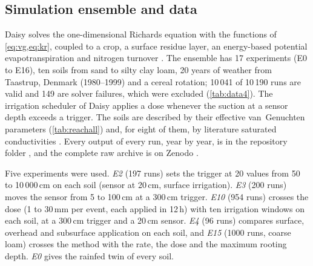\documentclass[review,12pt,authoryear]{elsarticle}
\begin{document}
\subsection{Simulation ensemble and data}
Daisy solves the one-dimensional Richards equation \citep{Richards1931} with the functions of \cref{eq:vg,eq:kr}, coupled to a crop, a surface residue layer, an energy-based potential evapotranspiration and nitrogen turnover \citep{Hansen1991,Hansen2012,Holbak2026}. The ensemble has 17 experiments (E0 to E16), ten soils from sand to silty clay loam, 20 years of weather from Taastrup, Denmark (1980--1999) and a cereal rotation; 10\,041 of 10\,190 runs are valid and 149 are solver failures, which were excluded (\cref{tab:data4}). The irrigation scheduler of Daisy applies a dose whenever the suction at a sensor depth exceeds a trigger. The soils are described by their effective van~Genuchten parameters (\cref{tab:reachall}) and, for eight of them, by literature saturated conductivities \citep{Carsel1988}. Every output of every run, year by year, is in the repository folder \cslink{}, and the complete raw archive is on Zenodo \citep{HaliluData}.


Five experiments were used. \emph{E2} (197 runs) sets the trigger at 20 values from 50 to 10\,000\,cm on each soil (sensor at 20\,cm, surface irrigation). \emph{E3} (200 runs) moves the sensor from 5 to 100\,cm at a 300\,cm trigger. \emph{E10} (954 runs) crosses the dose (1 to 30\,mm per event, each applied in 12\,h) with ten irrigation windows on each soil, at a 300\,cm trigger and a 20\,cm sensor. \emph{E4} (96 runs) compares surface, overhead and subsurface application on each soil, and \emph{E15} (1000 runs, coarse loam) crosses the method with the rate, the dose and the maximum rooting depth. \emph{E0} gives the rainfed twin of every soil.
\end{document}
